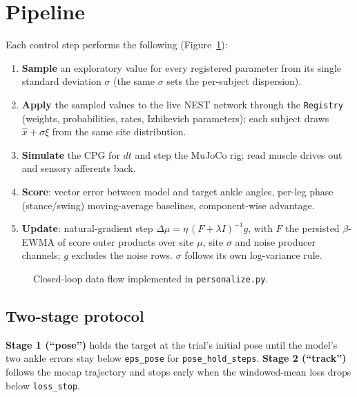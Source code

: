 \documentclass[11pt]{article}
\begin{document}
\section{Pipeline}
\label{sec:pipeline}

Each control step performs the following (Figure~\ref{fig:arch}):

\begin{enumerate}
  \item \textbf{Sample} an exploratory value for every registered parameter
        from its single standard deviation $\sigma$ (the same $\sigma$ sets the
        per-subject dispersion).
  \item \textbf{Apply} the sampled values to the live NEST network through the
        \texttt{Registry} (weights, probabilities, rates, Izhikevich
        parameters); each subject draws $\hat{x}+\sigma\xi$ from the same site
        distribution.
  \item \textbf{Simulate} the CPG for $dt$ and step the MuJoCo rig; read muscle
        drives out and sensory afferents back.
  \item \textbf{Score}: vector error between model and target ankle angles,
        per-leg phase (stance/swing) moving-average baselines, component-wise
        advantage.
  \item \textbf{Update}: natural-gradient step
        $\Delta\mu=\eta\,(F+\lambda I)^{-1}g$, with $F$ the persisted
        $\beta$-EWMA of score outer products over site $\mu$, site $\sigma$ and
        noise producer channels; $g$ excludes the noise rows. $\sigma$ follows
        its own log-variance rule.
\end{enumerate}

\begin{figure}[h]
\centering
{}
\caption{Closed-loop data flow implemented in \texttt{personalize.py}.}
\label{fig:arch}
\end{figure}

\subsection{Two-stage protocol}
\textbf{Stage 1 (``pose'')} holds the target at the trial's initial pose until
the model's two ankle errors stay below \texttt{eps\_pose} for
\texttt{pose\_hold\_steps}. \textbf{Stage 2 (``track'')} follows the mocap
trajectory and stops early when the windowed-mean loss drops below
\texttt{loss\_stop}.
\end{document}
